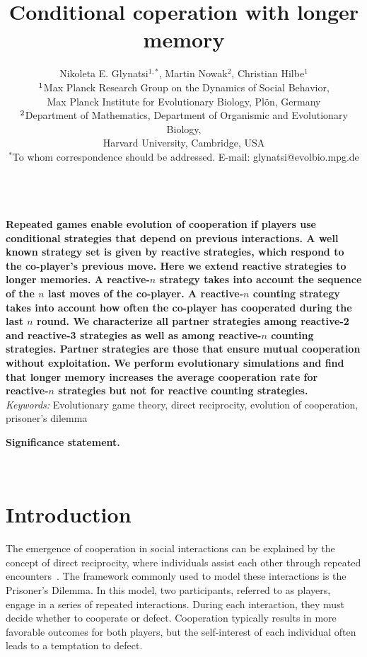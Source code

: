 \documentclass[11pt]{article}
\title{\bfseries \sffamily \Large Conditional coperation with longer memory}
\author{Nikoleta E. Glynatsi$^{1,*}$, Martin Nowak$^2$, Christian Hilbe$^1$\\[0.3cm]
$^{\rm 1}$Max Planck Research Group on the Dynamics of Social Behavior,\\ Max Planck Institute for Evolutionary Biology, Pl\"{o}n, Germany \\
$^{\rm 2}$Department of Mathematics,
Department of Organismic and Evolutionary Biology,\\ Harvard University, Cambridge, USA\\
$^*$To whom correspondence should be addressed. E-mail: glynatsi@evolbio.mpg.de
}
\date{}
\begin{document}
\maketitle

~\\[0.5cm]
\noindent
{\bf 
Repeated games enable evolution of cooperation if players use conditional
strategies that depend on previous interactions. A well known strategy set is
given by reactive strategies, which respond to the co-player's previous move.
Here we extend reactive strategies to longer memories. A reactive-$n$ strategy
takes into account the sequence of the $n$ last moves of the co-player. A
reactive-$n$ counting strategy takes into account how often the co-player has
cooperated during the last $n$ round. We characterize all partner strategies among
reactive-2 and reactive-3 strategies as well as among reactive-$n$ counting
strategies. Partner strategies are those that ensure mutual cooperation without
exploitation. We perform evolutionary simulations and find that longer memory
increases the average cooperation rate for reactive-$n$ strategies but not for
reactive counting strategies.
}\\[1cm]


\noindent
{\it Keywords:} Evolutionary game theory, direct reciprocity, evolution of cooperation, prisoner's dilemma



\clearpage
\newpage

\noindent
{\bf Significance statement.}

~\\[1cm]

\section*{Introduction}

The emergence of cooperation in social interactions can be explained by the
concept of direct reciprocity, where individuals assist each other through
repeated encounters~\cite{axelrod:AAAS:1981, nowak:Science:2006, sigmund2010}.
The framework commonly used to model these interactions is the Prisoner's
Dilemma. In this model, two participants, referred to as players, engage in a
series of repeated interactions. During each interaction, they must decide
whether to cooperate or defect. Cooperation typically results in more favorable
outcomes for both players, but the self-interest of each individual often leads
to a temptation to defect.
\end{document}
